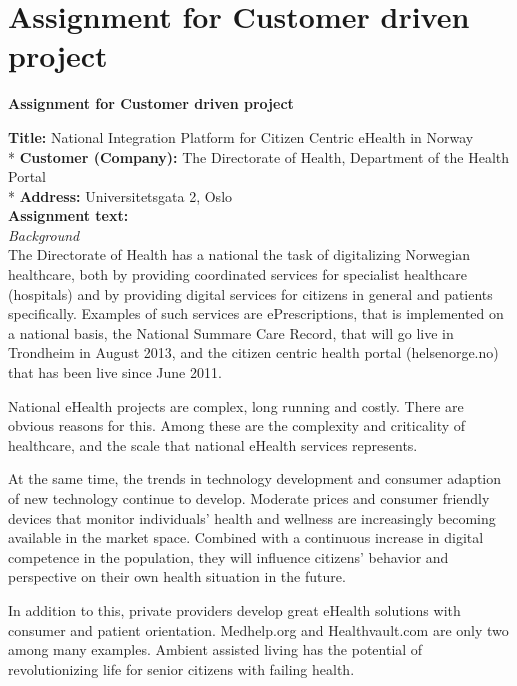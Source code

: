 
\chapter{Assignment for Customer driven project} 

\label{AppendixA} %

\textbf{Assignment for Customer driven project}

\textbf{Title:} 	National Integration Platform for Citizen Centric eHealth in Norway \\*
\textbf{Customer (Company):} 	The Directorate of Health, Department of the Health Portal\\*
\textbf{Address:}			Universitetsgata 2, Oslo \\


\textbf{Assignment text:} \\
\textit{Background} \\
The Directorate of Health has a national the task of digitalizing Norwegian healthcare, both by providing coordinated services for specialist healthcare (hospitals) and by providing digital services for citizens in general and patients specifically. 
Examples of such services are ePrescriptions, that is implemented on a national basis, the National Summare Care Record, that will go live in Trondheim in August 2013, and the citizen centric health portal  (helsenorge.no) that has been live since June 2011.

National eHealth projects are complex, long running and costly. There are obvious reasons for this. 
Among these are the complexity and criticality of healthcare, and the scale that national eHealth services represents. 

At the same time, the trends in technology development and consumer adaption of new technology continue to develop. 
Moderate prices and consumer friendly devices that monitor individuals’ health and wellness are increasingly becoming available in the market space. 
Combined with a continuous increase in digital competence in the population, they will influence citizens’ behavior and perspective on their own health situation in the future.

In addition to this, private providers develop great eHealth solutions with consumer and patient orientation. Medhelp.org and Healthvault.com are only two among many examples. 
Ambient assisted living has the potential of revolutionizing life for senior citizens with failing health.

